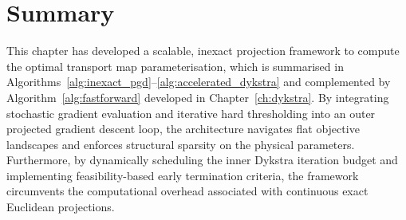 \section{Summary} \label{sec:optimisation_summary}

This chapter has developed a scalable, inexact projection framework to compute the optimal transport map parameterisation, which is summarised in Algorithms~\ref{alg:inexact_pgd}--\ref{alg:accelerated_dykstra} and complemented by Algorithm~\ref{alg:fastforward} developed in Chapter~\ref{ch:dykstra}. By integrating stochastic gradient evaluation and iterative hard thresholding into an outer projected gradient descent loop, the architecture navigates flat objective landscapes and enforces structural sparsity on the physical parameters. Furthermore, by dynamically scheduling the inner Dykstra iteration budget and implementing feasibility-based early termination criteria, the framework circumvents the computational overhead associated with continuous exact Euclidean projections. 

